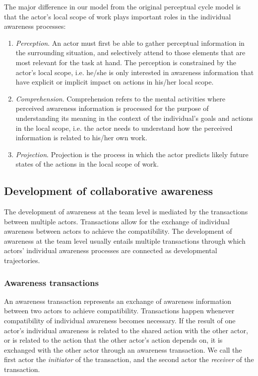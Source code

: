 The major difference in our model from the original perceptual cycle model is that the actor's local scope of work plays important roles in the individual awareness processes:

\begin{enumerate}
	\item \emph{Perception}. An actor must first be able to gather perceptual information in the surrounding situation, and selectively attend to those elements that are most relevant for the task at hand. The perception is constrained by the actor's local scope, i.e. he/she is only interested in awareness information that have explicit or implicit impact on actions in his/her local scope.
   \item \emph{Comprehension}. Comprehension refers to the mental activities where perceived awareness information is processed for the purpose of understanding its meaning in the context of the individual's goals and actions in the local scope, i.e. the actor needs to understand how the perceived information is related to his/her own work.
	\item \emph{Projection}. Projection is the process in which the actor predicts likely future states of the actions in the local scope of work.
\end{enumerate}

\subsection{Development of collaborative awareness} %
\label{sub:development_of_collaborative_awareness}
The development of awareness at the team level is mediated by the transactions between multiple actors. Transactions allow for the exchange of individual awareness between actors to achieve the compatibility. The development of awareness at the team level usually entails multiple transactions through which actors' individual awareness processes are connected as developmental trajectories.

\subsubsection{Awareness transactions} %
\label{ssub:awareness_transactions}
An awareness transaction represents an exchange of awareness information between two actors to achieve compatibility. Transactions happen whenever compatibility of individual awareness becomes necessary. If the result of one actor's individual awareness is related to the shared action with the other actor, or is related to the action that the other actor's action depends on, it is exchanged with the other actor through an awareness transaction. We call the first actor the \emph{initiator} of the transaction, and the second actor the \emph{receiver} of the transaction.

